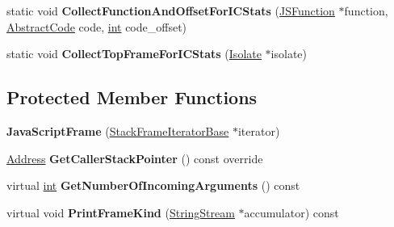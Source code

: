 \begin{DoxyCompactItemize}
\item 
\mbox{\label{classv8_1_1internal_1_1JavaScriptFrame_a7982d38a54be21611985ca000f753d0c}} 
static void {\bfseries Collect\+Function\+And\+Offset\+For\+I\+C\+Stats} (\mbox{\hyperlink{classv8_1_1internal_1_1JSFunction}{J\+S\+Function}} $\ast$function, \mbox{\hyperlink{classv8_1_1internal_1_1AbstractCode}{Abstract\+Code}} code, \mbox{\hyperlink{classint}{int}} code\+\_\+offset)
\item 
\mbox{\label{classv8_1_1internal_1_1JavaScriptFrame_a61c67343d067a6bae7d540baa78ef25e}} 
static void {\bfseries Collect\+Top\+Frame\+For\+I\+C\+Stats} (\mbox{\hyperlink{classv8_1_1internal_1_1Isolate}{Isolate}} $\ast$isolate)
\end{DoxyCompactItemize}
\subsection*{Protected Member Functions}
\begin{DoxyCompactItemize}
\item 
\mbox{\label{classv8_1_1internal_1_1JavaScriptFrame_a75cddddb27dcc0eb6db3cddd6629d531}} 
{\bfseries Java\+Script\+Frame} (\mbox{\hyperlink{classv8_1_1internal_1_1StackFrameIteratorBase}{Stack\+Frame\+Iterator\+Base}} $\ast$iterator)
\item 
\mbox{\label{classv8_1_1internal_1_1JavaScriptFrame_a137d1ca2beb6143c7f37f0c086d5289a}} 
\mbox{\hyperlink{classuintptr__t}{Address}} {\bfseries Get\+Caller\+Stack\+Pointer} () const override
\item 
\mbox{\label{classv8_1_1internal_1_1JavaScriptFrame_a05f34a73bbc7dbf535aa896de1928434}} 
virtual \mbox{\hyperlink{classint}{int}} {\bfseries Get\+Number\+Of\+Incoming\+Arguments} () const
\item 
\mbox{\label{classv8_1_1internal_1_1JavaScriptFrame_a766472e0a76c066b3a89de5c991a16a7}} 
virtual void {\bfseries Print\+Frame\+Kind} (\mbox{\hyperlink{classv8_1_1internal_1_1StringStream}{String\+Stream}} $\ast$accumulator) const
\end{DoxyCompactItemize}
